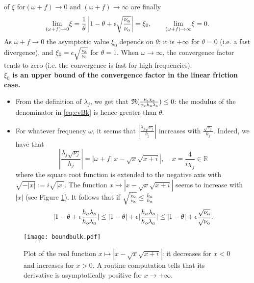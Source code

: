of $\xi$ for$(\omega+f) \rightarrow 0$ and
$(\omega+f) \rightarrow \infty$ are finally
\[
 \underset{(\omega+f) \rightarrow 0}{\mathrm{lim}} \xi = \frac{1}{\theta} \left| 1-\theta+\epsilon \sqrt{\frac{\nu_{\rm a}}{\nu_{\rm o}}}  \right| = \xi_0, \qquad
 \underset{(\omega+f) \rightarrow \infty}{\mathrm{lim}} \xi = 0.
\]
As $\omega + f \to 0$ the asymptotic value 
$\xi_0$ depends on $\theta$: it is $+\infty$ for $\theta=0$ (i.e. a fast divergence), and $\xi_0 = \epsilon\sqrt{\frac{\nu_{\rm a}}{\nu_{\rm o}}}$ for $\theta=1$.
When $\omega\to \infty$, the convergence factor tends to zero 
(i.e. the convergence is fast for high frequencies).
\\[3mm]
\textbf{$\xi_0$ is an upper bound of the convergence factor in the linear friction case.}\hspace*{5mm} %
\begin{itemize}
    \item From the definition of $\lambda_j$, we get that $\mathfrak{R}(\frac{\nu_{\rm a}\chi_{\rm a}}{\alpha_c h_{\rm a} \lambda_{\rm a}}) \leq 0$: the modulus of the denominator in \eqref{eq:cvBk} is hence greater than $\theta$.
    \item For whatever frequency $\omega$, it seems that $\left|\frac{\lambda_j \sqrt{\nu_j}}{h_j}\right|$ increases with $\frac{\sqrt{\nu_j}}{h_j}$.
    Indeed, we have that
	\begin{equation}
	\left|\frac{\lambda_j \sqrt{\nu_j}}{h_j}\right|
		= |\omega + f| |x - \sqrt{x}\sqrt{x+i}|,
		~~~~~ x = \frac{4}{i \chi_j} \in \mathbb{R}
	\end{equation}
	where the square root function is extended to the
		negative axis with $\sqrt{-|x|} := i\sqrt{|x|}$.
	The function $x \mapsto |x - \sqrt{x}\sqrt{x+i}|$
		seems to increase with $|x|$
    (see Figure \ref{fig:figboundbulk}). It follows that if
	$\sqrt{\frac{\nu_{\rm o}}{\nu_{\rm a}}} \leq
		\frac{h_{\rm o}}{h_{\rm a}}$
\begin{equation}
    |1-\theta+\epsilon \frac{h_a \lambda_o}{h_o \lambda_a}| \leq | 1 - \theta| + \epsilon |\frac{h_a \lambda_o}{h_o \lambda_a}| \leq 
    |1 - \theta| + \epsilon \frac{\sqrt{\nu_{\rm a}}}{\sqrt{\nu_{\rm o}}}.
\end{equation}
\end{itemize}
\begin{figure}
    \centering
    \texttt{[image: boundbulk.pdf]}
    \caption{Plot of the real function
	$x \mapsto |x - \sqrt{x}\sqrt{x+i}|$:
	 it decreases for $x<0$ and increases for $x>0$. A routine
	 computation tells that its derivative is asymptotically
	 positive for $x\rightarrow+\infty$.
	 }
    \label{fig:figboundbulk}
\end{figure}
